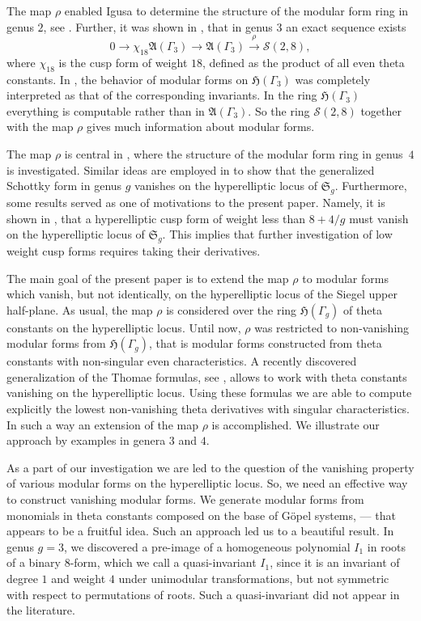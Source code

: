 \documentclass[twoside]{amsart}
\theoremstyle{definition}
\theoremstyle{plain}
\begin{document}
The map $\rho$ enabled Igusa to determine the structure of the modular form ring 
in genus $2$, see \cite{Ig1962}. Further, it was shown in \cite{Ig1967}, that in genus $3$ 
an exact sequence exists
$$ 0 \to \chi_{18} \mathfrak{A}(\Gamma_3) \to \mathfrak{A}(\Gamma_3) \overset{\rho}{\to} \mathcal{S}(2,8),$$
where $\chi_{18}$ is the cusp form of weight $18$, defined as  the product of all even theta constants. 
In \cite{Tsu1986}, the behavior of modular forms on $\mathfrak{H}(\Gamma_3)$ 
was completely interpreted as that of the corresponding invariants.
 In the ring  $\mathfrak{H}(\Gamma_3)$ everything is computable rather than in $\mathfrak{A}(\Gamma_3)$. 
 So the ring  $\mathcal{S}(2,8)$  together with the map $\rho$ gives much information about modular forms. 

The map $\rho$ is central in \cite{Poor2008}, 
where the structure of the modular form ring in genus~$4$ is investigated.
Similar ideas are employed in \cite{Poor1996} to show that the generalized Schottky form in 
genus $g$ vanishes 
on the hyperelliptic locus of $\mathfrak{S}_g$. 
Furthermore, some results served as one of motivations to the present paper. 
Namely,  it is shown  in \cite[Cor.\,3.9]{Poor1996}, that a hyperelliptic cusp form  
of  weight less than $8+4/g$  must vanish on the hyperelliptic locus of $\mathfrak{S}_g$.
This implies that further investigation of low weight cusp forms 
requires taking their derivatives. 

The main goal of the present paper is to extend the map $\rho$ 
to modular forms which vanish, but not identically, on the hyperelliptic locus of the Siegel upper half-plane. 
As usual,  the map $\rho$ is considered over the ring $\mathfrak{H}(\Gamma_g)$ 
of theta constants on the hyperelliptic locus.
Until now,  $\rho$ was restricted to non-vanishing modular forms 
from $\mathfrak{H}(\Gamma_g)$, that is modular forms constructed from 
theta constants with non-singular even characteristics.
A recently discovered generalization of the Thomae formulas, see \cite{bGTF},  
allows to work with theta constants vanishing on the hyperelliptic locus.
Using these formulas we are able to compute explicitly the lowest non-vanishing theta
derivatives with singular characteristics. In such a way an extension of the map $\rho$ is accomplished. 
We illustrate  our approach by examples in genera $3$ and $4$.

As a part of our investigation we are led to the question of the vanishing property 
of various modular forms on the hyperelliptic locus. 
So, we need an effective way to construct vanishing modular forms.
We generate modular forms from monomials in theta constants composed
on the base of G\"{o}pel systems, --- that appears to be a fruitful idea. 
Such an approach led us to a beautiful result.
In genus $g=3$, we discovered a pre-image of a homogeneous polynomial $I_1$ 
in roots of a binary $8$-form, which we call
 a quasi-invariant $I_1$, since it is an invariant  of degree $1$ and weight $4$
under unimodular transformations, but not symmetric with respect to permutations of roots. 
Such a quasi-invariant did not appear in the literature.
\end{document}
